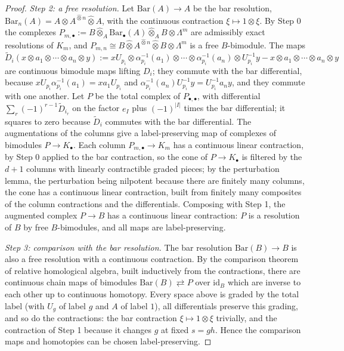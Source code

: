 \documentclass[11pt]{amsart}
\theoremstyle{definition}
\theoremstyle{remark}
\begin{document}
\begin{proof}
\emph{Step 2: a free resolution.}  Let $\mathrm{Bar}(A)\to A$ be the bar
resolution, $\mathrm{Bar}_n(A)=A\widehat\otimes A^{\widehat\otimes
n}\widehat\otimes A$, with the continuous contraction
$\xi\mapsto1\otimes\xi$.  By Step 0 the complexes
$P_{m,\bullet}:=B\widehat\otimes_A\mathrm{Bar}_{\bullet}(A)\widehat\otimes_A
B\otimes\Lambda^{m}$ are admissibly exact resolutions of $K_m$, and
$P_{m,n}\cong B\widehat\otimes A^{\widehat\otimes n}\widehat\otimes
B\otimes\Lambda^{m}$ is a free $B$-bimodule.  The maps
\[
\widetilde D_i(x\otimes a_1\otimes\cdots\otimes a_n\otimes y):=
xU_{p_i}\otimes\alpha_{p_i}^{-1}(a_1)\otimes\cdots\otimes
\alpha_{p_i}^{-1}(a_n)\otimes U_{p_i}^{-1}y-x\otimes a_1\otimes\cdots\otimes
a_n\otimes y
\]
are continuous bimodule maps lifting $D_i$; they commute with the bar
differential, because $xU_{p_i}\alpha_{p_i}^{-1}(a_1)=xa_1U_{p_i}$ and
$\alpha_{p_i}^{-1}(a_n)U_{p_i}^{-1}y=U_{p_i}^{-1}a_ny$, and they commute with
one another.  Let $P$ be the total complex of $P_{\bullet,\bullet}$, with
differential $\sum_r(-1)^{r-1}\widetilde D_{i_r}$ on the factor $e_I$ plus
$(-1)^{|I|}$ times the bar differential; it squares to zero because
$\widetilde D_i$ commutes with the bar differential.  The augmentations of the
columns give a label-preserving map of complexes of bimodules
$P\to K_{\bullet}$.  Each column $P_{m,\bullet}\to K_m$ has a continuous
linear contraction, by Step 0 applied to the bar contraction, so the cone of
$P\to K_{\bullet}$ is filtered by the $d+1$ columns with linearly contractible
graded pieces; by the perturbation lemma, the perturbation being nilpotent
because there are finitely many columns, the cone has a continuous linear
contraction, built from finitely many composites of the column contractions
and the differentials.  Composing with Step 1, the augmented complex $P\to B$
has a continuous linear contraction: $P$ is a resolution of $B$ by free
$B$-bimodules, and all maps are label-preserving.

\emph{Step 3: comparison with the bar resolution.}  The bar resolution
$\mathrm{Bar}(B)\to B$ is also a free resolution with a continuous
contraction.  By the comparison theorem of relative homological algebra, built
inductively from the contractions, there are continuous chain maps of
bimodules $\mathrm{Bar}(B)\rightleftarrows P$ over $\mathrm{id}_B$ which are
inverse to each other up to continuous homotopy.  Every space above is graded
by the total label (with $U_g$ of label $g$ and $A$ of label $1$), all
differentials preserve this grading, and so do the contractions: the bar
contraction $\xi\mapsto1\otimes\xi$ trivially, and the contraction of Step 1
because it changes $g$ at fixed $s=gh$.  Hence the comparison maps and
homotopies can be chosen label-preserving.


\end{proof}
\end{document}
